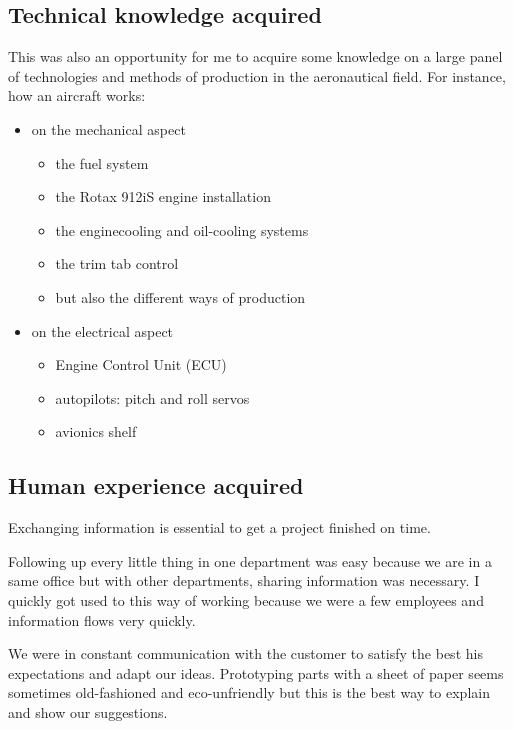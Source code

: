 \documentclass[11pt,a4paper]{article}
\begin{document}
\subsection{Technical knowledge acquired}
This was also an opportunity for me to acquire some knowledge on a large panel of technologies and methods of production in the aeronautical field. For instance, how an aircraft works:
\begin{itemize}
\setlength{\itemsep}{0pt}
\item on the mechanical aspect
\begin{itemize}
\setlength{\itemsep}{0pt}
\item the fuel system
\item the Rotax 912iS engine installation
\item the enginecooling and oil-cooling systems
\item the trim tab control
\item but also the different ways of production
\end{itemize}
\item on the electrical aspect
\begin{itemize}
\setlength{\itemsep}{0pt}
\item Engine Control Unit (ECU)
\item autopilots: pitch and roll servos
\item avionics shelf
\end{itemize}
\end{itemize}

\subsection{Human experience acquired}
Exchanging information is essential to get a project finished on time. 

\bigskip

Following up every little thing in one department was easy because we are in a same office but with other departments, sharing information was necessary. I quickly got used to this way of working because we were a few employees and information flows very quickly.

\bigskip

We were in constant communication with the customer to satisfy the best his expectations and adapt our ideas. Prototyping parts with a sheet of paper seems sometimes old-fashioned and eco-unfriendly but this is the best way to explain and show our suggestions.

\newpage
\end{document}
